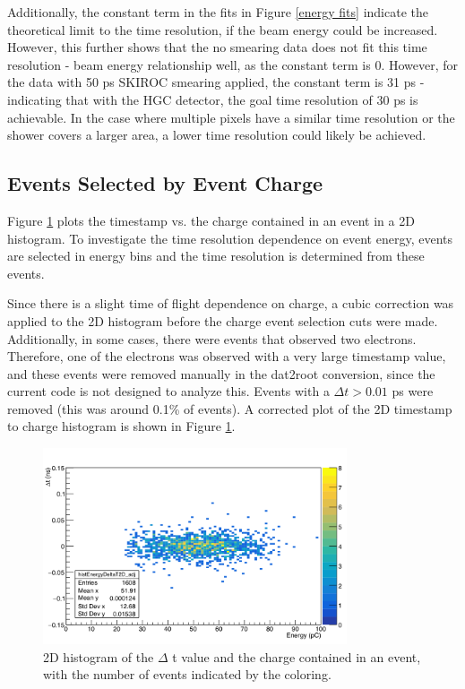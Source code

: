 \documentclass[twocolumn,aps,prd,reprint]{revtex4-1}
\begin{document}
Additionally, the constant term in the fits in Figure \ref{energy fits} indicate the theoretical limit to the time resolution, if the beam energy could be increased. However, this further shows that the no smearing data does not fit this time resolution - beam energy relationship well, as the constant term is 0. However, for the data with 50 ps SKIROC smearing applied, the constant term is 31 ps - indicating that with the HGC detector, the goal time resolution of 30 ps is achievable. In the case where multiple pixels have a similar time resolution or the shower covers a larger area, a lower time resolution could likely be achieved.

\subsection{Events Selected by Event Charge}

Figure \ref{2D histogram} plots the timestamp vs. the charge contained in an event in a 2D histogram. To investigate the time resolution dependence on event energy, events are selected in energy bins and the time resolution is determined from these events.

Since there is a slight time of flight dependence on charge, a cubic correction was applied to the 2D histogram before the charge event selection cuts were made. Additionally, in some cases, there were events that observed two electrons. Therefore, one of the electrons was observed with a very large timestamp value, and these events were removed manually in the dat2root conversion, since the current code is not designed to analyze this. Events with a $\Delta t > 0.01$ ps were removed (this was around 0.1\% of events). A corrected plot of the 2D timestamp to charge histogram is shown in Figure \ref{2D histogram}.

\begin{figure}[!htbp]
\centering
\includegraphics[width = 0.8\textwidth]{32_1mm_2dhist}
\caption{2D histogram of the $\Delta$ t value and the charge contained in an event, with the number of events indicated by the coloring.}
\label{2D histogram}
\end{figure}
\end{document}
